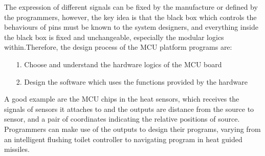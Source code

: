\documentclass[11pt,openright,a4paper]{report}
\begin{document}
The expression of different signals can be fixed by the manufacture or defined by the programmers, however, the key idea is that the black box which controls the behaviours of pins must be known to the system designers, and everything inside the black box is fixed and unchangeable, especially the modular logics within.Therefore, the design process of the MCU platform programs are:
\begin{itemize}
	\item[1.] Choose and understand the hardware logics of the MCU board
	\item[2.] Design the software which uses the functions provided by the hardware
\end{itemize}
A good example are the MCU chips in the heat sensors, which receives the signals of sensors it attaches to and the outputs are distance from the source to sensor, and a pair of coordinates indicating the relative positions of source. Programmers can make use of the outputs to design their programs, varying from an intelligent flushing toilet controller to navigating program in heat guided missiles.\\ 
\end{document}
